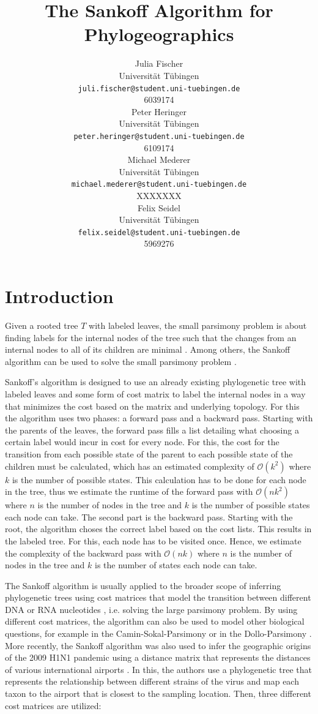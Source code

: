 \documentclass{article}
\title{The Sankoff Algorithm for Phylogeographics}
\author{
  Julia Fischer \\
  Universität Tübingen \\
  \texttt{juli.fischer@student.uni-tuebingen.de} \\
  6039174 \\
  \And
  Peter Heringer \\
  Universität Tübingen \\
  \texttt{peter.heringer@student.uni-tuebingen.de} \\
  6109174 \\
  \And 
  Michael Mederer \\
  Universität Tübingen \\
  \texttt{michael.mederer@student.uni-tuebingen.de} \\
  XXXXXXX \\
  \And 
  Felix Seidel \\
  Universität Tübingen \\
  \texttt{felix.seidel@student.uni-tuebingen.de} \\
  5969276 \\
}
\begin{document}
\maketitle

\begin{abstract}
\end{abstract}


\section{Introduction}
Given a rooted tree $T$ with labeled leaves, the small parsimony problem is about
finding labels for the internal nodes of the tree such that the changes from an
internal nodes to all of its children are minimal
\cite{jonesIntroductionBioinformaticsAlgorithms2004}.
Among others, the Sankoff algorithm can be used to solve the small parsimony
problem \cite{sankoffMinimalMutationTrees1975}. 

Sankoff's algorithm is designed to use an already existing phylogenetic tree with labeled leaves and
some form of cost matrix to label the internal nodes in a way that minimizes the cost based on the
matrix and underlying topology. For this the algorithm uses two phases: a
forward pass and a backward pass.
Starting with the parents of the leaves, the forward pass fills a
list detailing what choosing a certain label would incur in
cost for every node. For this, the cost for the transition from each possible state of the
parent to each possible state of the children must be calculated, which has an
estimated complexity of $\mathcal{O}(k^2)$ where $k$ is the number of possible
states. This calculation has to be done for each node in the tree, thus we
estimate the runtime of the forward pass
with $\mathcal{O}(nk^2)$ where $n$ is the number of nodes in the tree and $k$ is
the number of possible states each node can take.
The second part is the backward pass. Starting with the root, the algorithm
choses the correct label based on the cost lists. This results in the labeled
tree. For this, each node has to be visited once. Hence, we estimate the
complexity of the backward pass with $\mathcal{O}(nk)$ where $n$ is the number of
nodes in the tree and $k$ is the number of states each node can take.

The Sankoff algorithm is usually applied to the broader scope of
inferring phylogenetic trees using cost matrices that model the transition
between different DNA or RNA nucleotides
\cite{jonesIntroductionBioinformaticsAlgorithms2004}, i.e. solving the large parsimony problem. By
using different cost
matrices, the algorithm can also be used to model other biological questions,
for example in the Camin-Sokal-Parsimony \cite{caminMethodDeducingBranching1965}
or in the Dollo-Parsimony \cite{farrisPhylogeneticAnalysisDollo2022}. More
recently, the Sankoff algorithm was also used to infer the geographic origins of
the 2009 H1N1 pandemic using a distance matrix that represents the distances of
various international airports
\cite{reimeringPhylogeographicReconstructionUsing2020}. In this, the authors use
a phylogenetic tree that represents the relationship between different strains
of the virus and map each taxon to the airport that is closest to the sampling
location. Then, three different cost matrices are utilized:
\end{document}
